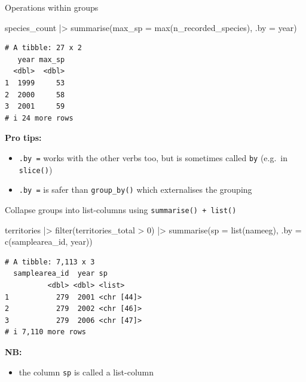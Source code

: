 \documentclass[
  ignorenonframetext,
  aspectratio=169,
]{beamer}
\newenvironment{Shaded}{\begin{snugshade}}{\end{snugshade}}
\newcommand{\AttributeTok}[1]{\textcolor[rgb]{0.40,0.45,0.13}{#1}}
\newcommand{\DecValTok}[1]{\textcolor[rgb]{0.68,0.00,0.00}{#1}}
\newcommand{\FunctionTok}[1]{\textcolor[rgb]{0.28,0.35,0.67}{#1}}
\newcommand{\NormalTok}[1]{\textcolor[rgb]{0.00,0.23,0.31}{#1}}
\newcommand{\SpecialCharTok}[1]{\textcolor[rgb]{0.37,0.37,0.37}{#1}}
\providecommand{\tightlist}{%
  \setlength{\itemsep}{0pt}\setlength{\parskip}{0pt}}
\let\oldtexttt\texttt
\renewcommand{\texttt}[1]{\colorbox{gray!20}{\oldtexttt{#1}}}
\begin{document}
\begin{frame}[fragile]{Operations within groups}
\protect{}\label{operations-within-groups}
\footnotesize

\begin{Shaded}
\begin{Highlighting}[]
\NormalTok{species\_count }\SpecialCharTok{|\textgreater{}} 
    \FunctionTok{summarise}\NormalTok{(}\AttributeTok{max\_sp =} \FunctionTok{max}\NormalTok{(n\_recorded\_species), }\AttributeTok{.by =}\NormalTok{ year)}
\end{Highlighting}
\end{Shaded}

\begin{verbatim}
# A tibble: 27 x 2
   year max_sp
  <dbl>  <dbl>
1  1999     53
2  2000     58
3  2001     59
# i 24 more rows
\end{verbatim}

\normalsize

\pause

\textbf{Pro tips:}

\begin{itemize}
\tightlist
\item
  \texttt{.by\ =} works with the other verbs too, but is sometimes
  called \texttt{by} (e.g.~in \texttt{slice()})
\item
  \texttt{.by\ =} is safer than \texttt{group\_by()} which externalises
  the grouping
\end{itemize}
\end{frame}

\begin{frame}[fragile]{Collapse groups into list-columns using
\texttt{summarise()\ +\ list()}}
\protect{}\label{collapse-groups-into-list-columns-using-summarise-list}
\footnotesize

\begin{Shaded}
\begin{Highlighting}[]
\NormalTok{territories }\SpecialCharTok{|\textgreater{}} 
    \FunctionTok{filter}\NormalTok{(territories\_total }\SpecialCharTok{\textgreater{}} \DecValTok{0}\NormalTok{) }\SpecialCharTok{|\textgreater{}} 
    \FunctionTok{summarise}\NormalTok{(}\AttributeTok{sp =} \FunctionTok{list}\NormalTok{(nameeg), }\AttributeTok{.by =} \FunctionTok{c}\NormalTok{(samplearea\_id, year))}
\end{Highlighting}
\end{Shaded}

\begin{verbatim}
# A tibble: 7,113 x 3
  samplearea_id  year sp        
          <dbl> <dbl> <list>    
1           279  2001 <chr [44]>
2           279  2002 <chr [46]>
3           279  2006 <chr [47]>
# i 7,110 more rows
\end{verbatim}

\normalsize

\pause

\textbf{NB:}

\begin{itemize}
\tightlist
\item
  the column \texttt{sp} is called a list-column
\end{itemize}
\end{frame}
\end{document}
